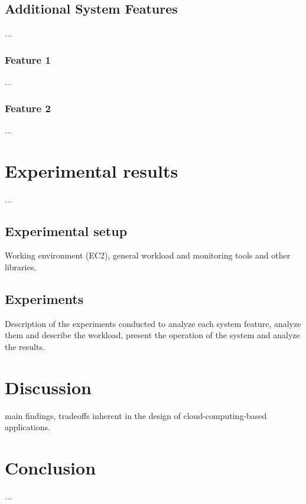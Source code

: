\documentclass{stylesheet}
\begin{document}
\subsection{Additional System Features}
...
\subsubsection{Feature 1}
...
\subsubsection{Feature 2}
...

\section{Experimental results}
...
\subsection{Experimental setup}
Working environment (EC2), general workload and monitoring tools and other libraries.

\subsection{Experiments}
Description of the experiments conducted to analyze each system feature, analyze them and describe the workload, present the operation of the system and analyze the results.

\section{Discussion}
main findings, tradeoffs inherent in the design of cloud-computing-based applications.

\section{Conclusion}
...



\end{document}
